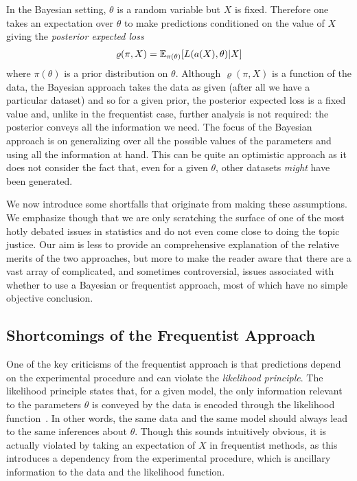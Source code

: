 In the Bayesian setting, $\theta$ is a random variable but $X$ is fixed.  Therefore one takes an expectation over $\theta$
to make predictions conditioned on the value of $X$ giving the \emph{posterior expected loss}~\cite{robert2007bayesian}
\begin{align}
\label{eq:bayes:bayes-est}
\varrho(\pi,X) = \mathbb{E}_{\pi(\theta)} [L(a(X),\theta) | X]
\end{align}
where $\pi(\theta)$ is a prior distribution on $\theta$.  Although $\varrho(\pi,X)$ is a function of the data, the Bayesian
approach takes the data as given (after all we have a particular dataset) and so for a given prior, the posterior
expected loss is a fixed value and, unlike in the frequentist case, further analysis is not required: the posterior
conveys all the information we need.  The focus of the Bayesian approach is on generalizing over all the possible values of
the parameters and using all the information at hand.  
This can be quite an optimistic approach as it does not consider the fact that, even for a given $\theta$,
other datasets \emph{might} have been generated.

We now introduce some shortfalls that originate from making these assumptions.  We emphasize though that we are only
scratching the surface of one of the most hotly debated issues in statistics and do not even come close to doing
the topic justice.  Our aim is less to provide an comprehensive explanation of the relative merits of the two approaches, but
more to make the reader aware that there are a vast array of complicated, and sometimes controversial,
issues associated with whether to use a Bayesian or
frequentist approach, most of which have no simple objective conclusion.


\subsection{Shortcomings of the Frequentist Approach}
\label{sec:bayes:religion:freq}

One of the key criticisms of the frequentist approach is that predictions depend on the experimental procedure and
can violate the \emph{likelihood principle}.  The likelihood principle states that, for a given model, 
the only information relevant
to the parameters $\theta$ is conveyed by the data is encoded through the likelihood function~\citep{robert2007bayesian}.  
In other words, the same data and 
the same model should always lead to the same inferences about $\theta$.  Though this sounds intuitively obvious, it is actually violated by
taking an expectation of $X$ in frequentist methods, as this introduces a dependency from the experimental procedure, which
is ancillary information to the data and the likelihood function.  

